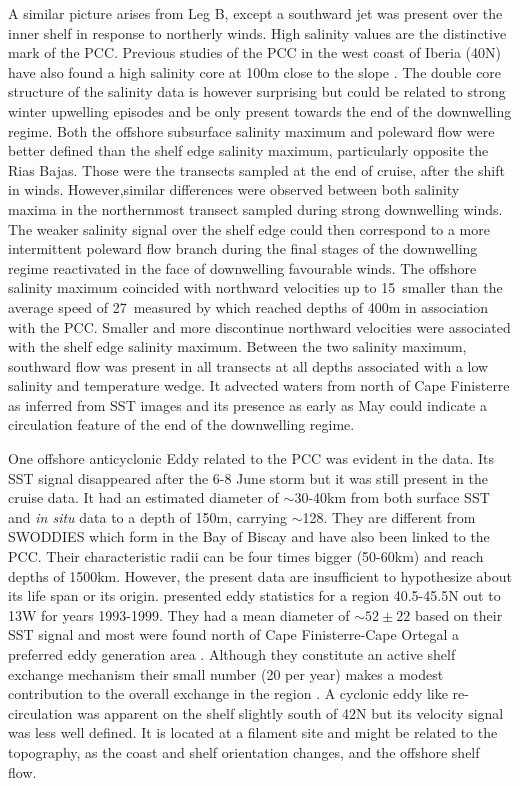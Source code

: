 A similar picture arises from Leg B, except a southward jet was
present over the inner shelf in response to northerly winds. High
salinity values are the distinctive mark of the PCC. Previous
studies of the PCC in the west coast of Iberia (40\deg N) have
also found a high salinity core at 100m close to the slope
\citep{Frouin90,Haynes90}. The double core structure of the
salinity data is however surprising but could be related to strong
winter upwelling episodes and be only present towards the end of
the downwelling regime. Both the offshore subsurface salinity
maximum and poleward flow were better defined than the shelf edge
salinity maximum, particularly opposite the Rias Bajas. Those were
the transects sampled at the end of cruise, after the shift in
winds. However,similar differences were observed between both
salinity maxima in the northernmost transect sampled during strong
downwelling winds. The weaker salinity signal over the shelf edge
could then correspond to a more intermittent poleward flow branch
during the final stages of the downwelling regime reactivated in
the face of downwelling favourable winds. The offshore salinity
maximum coincided with northward velocities up to 15\velc\,
smaller than the average speed of 27\velc\, measured by
\citet{Haynes90} which reached depths of 400m in association with
the PCC. Smaller and more discontinue northward velocities were
associated with the shelf edge salinity maximum. Between the two
salinity maximum, southward flow was present in all transects at
all depths associated with a low salinity and temperature wedge.
It advected waters from north of Cape Finisterre as inferred from
SST images and its presence as early as May could indicate a
circulation feature of the end of the downwelling regime.

One offshore anticyclonic Eddy related to the PCC was evident in
the data. Its SST signal disappeared after the 6-8 June storm but
it was still present in the cruise data. It had an estimated
diameter of $\sim$30-40km from both surface SST and \emph{in situ}
data to a depth of 150m, carrying $\sim$128\vol. They are
different from SWODDIES which form in the Bay of Biscay
\citep{Pingree94} and have also been linked to the PCC. Their
characteristic radii can be four times bigger (50-60km) and reach
depths of 1500km. However, the present data are insufficient to
hypothesize about its life span or its origin. \citet{Huthnance02}
presented eddy statistics for a region 40.5-45.5\deg N out to
13\deg W for years 1993-1999. They had a mean diameter of $\sim
52\pm 22$ based on their SST signal and most were found north of
Cape Finisterre-Cape Ortegal a preferred eddy generation area
\citep{Dubert98,Paillet02}. Although they constitute an active
shelf exchange mechanism their small number (20 per year) makes a
modest contribution to the overall exchange in the region
\citep{Huthnance02}. A cyclonic eddy like re-circulation was
apparent on the shelf slightly south of 42\deg N but its velocity
signal was less well defined. It is located at a filament site
\citep{Haynes93} and might be related to the topography, as the
coast and shelf orientation changes, and the offshore shelf flow.

